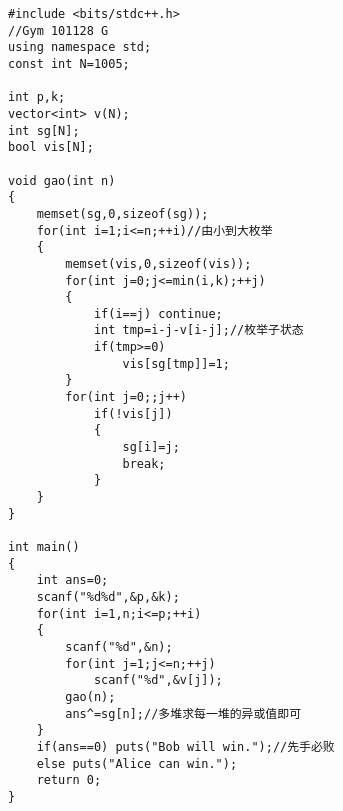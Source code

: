 \begin{lstlisting}
#include <bits/stdc++.h>
//Gym 101128 G
using namespace std;
const int N=1005;

int p,k;
vector<int> v(N);
int sg[N];
bool vis[N];

void gao(int n)
{
	memset(sg,0,sizeof(sg));
	for(int i=1;i<=n;++i)//由小到大枚举
	{
		memset(vis,0,sizeof(vis));
		for(int j=0;j<=min(i,k);++j)
		{
			if(i==j) continue;
			int tmp=i-j-v[i-j];//枚举子状态
			if(tmp>=0)
				vis[sg[tmp]]=1;
		}
		for(int j=0;;j++)
			if(!vis[j])
			{
				sg[i]=j;
				break;
			}
	}
}

int main()
{
	int ans=0;
	scanf("%d%d",&p,&k);
	for(int i=1,n;i<=p;++i)
	{
		scanf("%d",&n);
		for(int j=1;j<=n;++j)
			scanf("%d",&v[j]);
		gao(n);
		ans^=sg[n];//多堆求每一堆的异或值即可
	}
	if(ans==0) puts("Bob will win.");//先手必败
	else puts("Alice can win.");
	return 0;
}
\end{lstlisting}